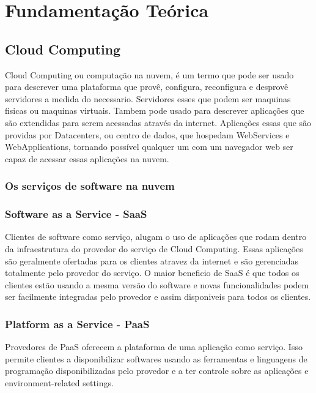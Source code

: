 \chapter{Fundamentação Teórica}
\section{Cloud Computing}
	Cloud Computing ou computação na nuvem, é um termo que pode ser usado para descrever uma plataforma que provê, configura, reconfigura e desprovê servidores a medida do necessario. Servidores esses que podem ser maquinas fisicas ou maquinas virtuais. Tambem pode usado para descrever aplicações que são extendidas para serem acessadas através da internet. Aplicações essas que são providas por Datacenters, ou centro de dados, que hospedam WebServices e WebApplications, tornando possível qualquer um com um navegador web ser capaz de acessar essas aplicações na nuvem.

\subsection{Os serviços de software na nuvem}
		
\subsection{Software as a Service - SaaS}
	Clientes de software como serviço, alugam o uso de aplicações que rodam dentro da infraestrutura do provedor do serviço de Cloud Computing. Essas aplicações são geralmente ofertadas para os clientes atravez da internet e são gerenciadas totalmente pelo provedor do serviço. O maior beneficio de SaaS é que todos os clientes estão usando a mesma versão do software e novas funcionalidades podem ser facilmente integradas pelo provedor e assim disponiveis para todos os clientes.


\subsection{Platform as a Service - PaaS}
	Provedores de PaaS oferecem a plataforma de uma aplicação como serviço. Isso permite clientes a disponibilizar softwares usando as ferramentas e linguagens de programação disponibilizadas pelo provedor e a ter controle sobre as aplicações e environment-related settings.

